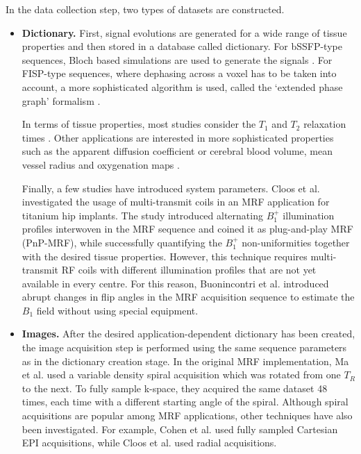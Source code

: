 In the data collection step, two types of datasets are constructed.
\begin{itemize}
    \item \textbf{Dictionary.} First, signal evolutions are generated for a wide range of tissue properties and then stored in a database called dictionary. 
    For bSSFP-type sequences, Bloch based
    simulations are used to generate the signals \cite{Hamilton2015}.
    For FISP-type sequences, where dephasing across a voxel has to be taken into account, a more sophisticated algorithm is used, called the `extended phase graph' formalism \cite{Weigel2015}. 
    
    In terms of tissue properties, most studies consider the $T_1$ and $T_2$ relaxation times \cite{Ma2013} \cite{Jiang2015} \cite{Hamilton2017} \cite{Gao2015} \cite{Amthor2017} \cite{Buonincontri2017}.
    Other applications are interested in more sophisticated properties such as the apparent diffusion coefficient \cite{Jiang2017} or cerebral blood volume, mean vessel radius and oxygenation maps \cite{Christen2014}.
    
    Finally, a few studies have introduced system parameters.
    Cloos et al. \cite{Cloos2016} investigated the usage of multi-transmit coils in an MRF application for titanium hip implants.
    The study introduced alternating $B_1^+$ illumination profiles interwoven in the MRF sequence and coined it as plug-and-play MRF (PnP-MRF), while successfully quantifying the $B_1^+$ non-uniformities together with the desired tissue properties.
    However, this technique requires multi-transmit RF coils with different illumination profiles that are not yet available in every centre.
    For this reason, Buonincontri et al. \cite{Buonincontri2017} introduced abrupt changes in flip angles in the MRF acquisition sequence to estimate the $B_1$ field without using special equipment.
    
    \item \textbf{Images.} After the desired application-dependent dictionary has been created, the image acquisition step is performed using the same sequence parameters as in the dictionary creation stage.
    In the original MRF implementation, Ma et al. \cite{Ma2013} used a variable density spiral acquisition which was rotated from one $T_R$ to the next.
    To fully sample k-space, they acquired the same dataset 48 times, each time with a different starting angle of the spiral.
    Although spiral acquisitions are popular among MRF applications, other techniques have also been investigated.
    For example, Cohen et al. \cite{Cohen2016} used fully sampled Cartesian EPI acquisitions, while Cloos et al. \cite{Cloos2016} used radial acquisitions.

\end{itemize}

